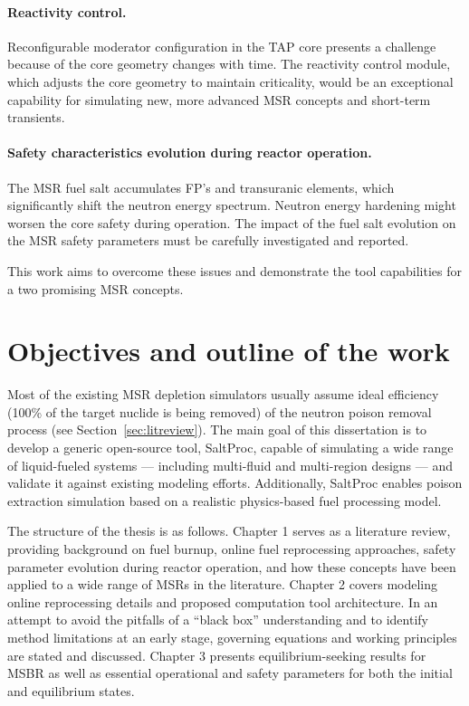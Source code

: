 \paragraph{Reactivity control.} Reconfigurable moderator configuration in the 
\gls{TAP} core presents a challenge because of the core geometry changes with 
time. The reactivity control module, which adjusts the core geometry 
to maintain criticality, would be an exceptional capability for simulating  
new, more advanced \gls{MSR} concepts and short-term transients.
\paragraph{Safety characteristics evolution during reactor operation.} The 
\gls{MSR} fuel salt  accumulates \gls{FP}'s and transuranic elements, which 
significantly shift the neutron energy spectrum. Neutron energy hardening 
might worsen the core safety during operation. The impact of the fuel salt 
evolution on the \gls{MSR} safety parameters must be carefully investigated 
and reported.

This work aims to overcome these issues and demonstrate the tool capabilities 
for a two promising \gls{MSR} concepts.


\section{Objectives and outline of the work}
Most of the existing \gls{MSR} depletion simulators usually assume ideal  
efficiency (100\% of the target nuclide is being removed) of the neutron 
poison removal process (see Section~\ref{sec:litreview}). The main goal of 
this dissertation is to develop a generic open-source tool, SaltProc, capable 
of simulating a wide range of liquid-fueled systems --- including multi-fluid 
and multi-region designs --- and validate it against existing modeling 
efforts. Additionally, SaltProc enables poison extraction simulation based on 
a realistic physics-based fuel processing model. 

The structure of the thesis is as follows. Chapter 1 serves as a literature 
review, providing background on fuel burnup, online fuel reprocessing  
approaches, safety parameter evolution during reactor operation, and how these 
concepts have been applied to a wide range of \glspl{MSR} in the literature. 
Chapter 2 covers modeling online reprocessing details and proposed computation 
tool architecture. In an attempt to avoid the pitfalls of a ``black box''  
understanding and to identify method limitations at an early stage, governing 
equations and working principles are stated and discussed. Chapter 3 presents 
equilibrium-seeking results for \gls{MSBR} as well as essential operational 
and safety parameters for both the initial and equilibrium states.

